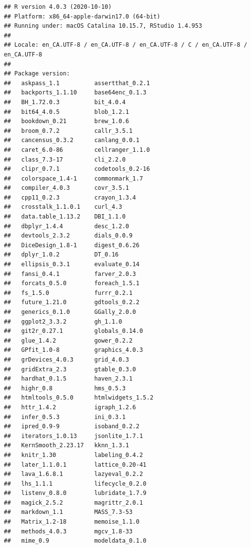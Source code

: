 \documentclass[
]{krantz}
\begin{document}
\begin{verbatim}
## R version 4.0.3 (2020-10-10)
## Platform: x86_64-apple-darwin17.0 (64-bit)
## Running under: macOS Catalina 10.15.7, RStudio 1.4.953
## 
## Locale: en_CA.UTF-8 / en_CA.UTF-8 / en_CA.UTF-8 / C / en_CA.UTF-8 / en_CA.UTF-8
## 
## Package version:
##   askpass_1.1          assertthat_0.2.1    
##   backports_1.1.10     base64enc_0.1.3     
##   BH_1.72.0.3          bit_4.0.4           
##   bit64_4.0.5          blob_1.2.1          
##   bookdown_0.21        brew_1.0.6          
##   broom_0.7.2          callr_3.5.1         
##   cancensus_0.3.2      canlang_0.0.1       
##   caret_6.0-86         cellranger_1.1.0    
##   class_7.3-17         cli_2.2.0           
##   clipr_0.7.1          codetools_0.2-16    
##   colorspace_1.4-1     commonmark_1.7      
##   compiler_4.0.3       covr_3.5.1          
##   cpp11_0.2.3          crayon_1.3.4        
##   crosstalk_1.1.0.1    curl_4.3            
##   data.table_1.13.2    DBI_1.1.0           
##   dbplyr_1.4.4         desc_1.2.0          
##   devtools_2.3.2       dials_0.0.9         
##   DiceDesign_1.8-1     digest_0.6.26       
##   dplyr_1.0.2          DT_0.16             
##   ellipsis_0.3.1       evaluate_0.14       
##   fansi_0.4.1          farver_2.0.3        
##   forcats_0.5.0        foreach_1.5.1       
##   fs_1.5.0             furrr_0.2.1         
##   future_1.21.0        gdtools_0.2.2       
##   generics_0.1.0       GGally_2.0.0        
##   ggplot2_3.3.2        gh_1.1.0            
##   git2r_0.27.1         globals_0.14.0      
##   glue_1.4.2           gower_0.2.2         
##   GPfit_1.0-8          graphics_4.0.3      
##   grDevices_4.0.3      grid_4.0.3          
##   gridExtra_2.3        gtable_0.3.0        
##   hardhat_0.1.5        haven_2.3.1         
##   highr_0.8            hms_0.5.3           
##   htmltools_0.5.0      htmlwidgets_1.5.2   
##   httr_1.4.2           igraph_1.2.6        
##   infer_0.5.3          ini_0.3.1           
##   ipred_0.9-9          isoband_0.2.2       
##   iterators_1.0.13     jsonlite_1.7.1      
##   KernSmooth_2.23.17   kknn_1.3.1          
##   knitr_1.30           labeling_0.4.2      
##   later_1.1.0.1        lattice_0.20-41     
##   lava_1.6.8.1         lazyeval_0.2.2      
##   lhs_1.1.1            lifecycle_0.2.0     
##   listenv_0.8.0        lubridate_1.7.9     
##   magick_2.5.2         magrittr_2.0.1      
##   markdown_1.1         MASS_7.3-53         
##   Matrix_1.2-18        memoise_1.1.0       
##   methods_4.0.3        mgcv_1.8-33         
##   mime_0.9             modeldata_0.1.0     

\end{verbatim}
\end{document}
